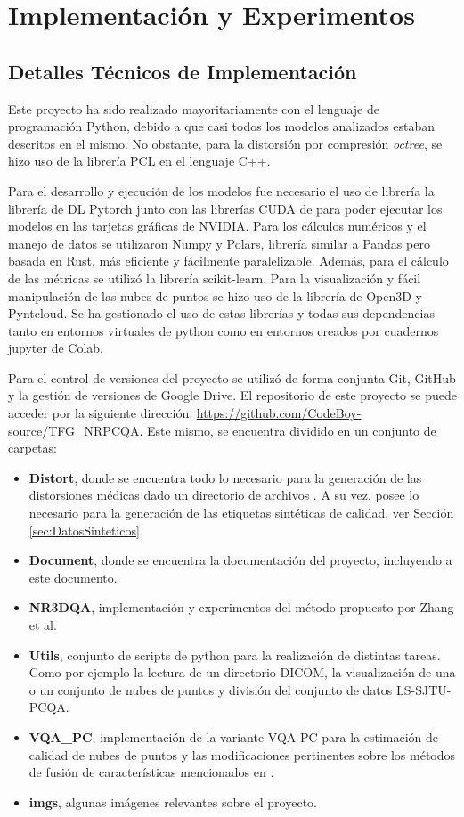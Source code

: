 \chapter{Implementación y Experimentos} 
\label{sec:Implementacion}
\section{Detalles Técnicos de Implementación} 
Este proyecto ha sido realizado mayoritariamente con el lenguaje de programación Python, 
debido a que casi todos los modelos analizados estaban descritos en el mismo.
No obstante, para la distorsión por compresión \emph{octree}\cite{OctreeCompression}, 
se hizo uso de la librería PCL\cite{PCL} en el lenguaje C++.

Para el desarrollo y ejecución de los modelos fue necesario el uso de librería 
la librería de DL Pytorch junto con las librerías CUDA de para poder ejecutar 
los modelos en las tarjetas gráficas de NVIDIA. Para los cálculos numéricos y 
el manejo de datos se utilizaron Numpy y Polars, librería similar a Pandas 
pero basada en Rust, más eficiente y fácilmente paralelizable. Además, para el
cálculo de las métricas se utilizó la librería scikit-learn.
Para la visualización y fácil manipulación de las nubes de puntos se hizo uso 
de la librería de Open3D\cite{Open3D} y Pyntcloud.
Se ha gestionado el uso de estas librerías y todas sus dependencias tanto en entornos virtuales 
de python como en entornos creados por cuadernos jupyter de Colab.

Para el control de versiones del proyecto se utilizó de forma conjunta Git, GitHub
y la gestión de versiones de Google Drive. El repositorio de este proyecto se 
puede acceder por la siguiente dirección: \url{https://github.com/CodeBoy-source/TFG_NRPCQA}.
Este mismo, se encuentra dividido en un conjunto de carpetas: 
\begin{itemize}
  \item \textbf{Distort}, donde se encuentra todo lo necesario para la generación 
    de las distorsiones médicas dado un directorio de archivos . 
    A su vez, posee lo necesario para la generación de las etiquetas sintéticas 
    de calidad, ver Sección \ref{sec:DatosSinteticos}.
  \item \textbf{Document}, donde se encuentra la documentación del proyecto, 
    incluyendo a este documento. 
  \item \textbf{NR3DQA}, implementación y experimentos del método propuesto 
    por Zhang et al\cite{NR3DQA}.
  \item \textbf{Utils}, conjunto de scripts de python para la realización de distintas 
    tareas. Como por ejemplo la lectura de un directorio DICOM, la visualización 
    de una o un conjunto de nubes de puntos y división del conjunto de datos LS-SJTU-PCQA\cite{ResSCNN}.
  \item \textbf{VQA\_PC}, implementación de la variante VQA-PC\cite{VQA-PC} para 
    la estimación de calidad de nubes de puntos y las modificaciones pertinentes 
    sobre los métodos de fusión de características mencionados en \cite{EnsemblePCQA}. 
  \item \textbf{imgs}, algunas imágenes relevantes sobre el proyecto. 
\end{itemize}
